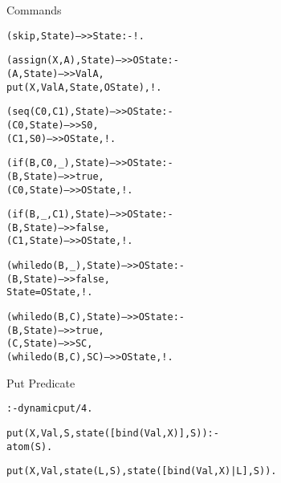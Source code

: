 \documentclass{beamer}
\begin{document}
\begin{frame}[fragile]{Commands}
\tiny
\begin{alltt}
% semantics of commands

(skip,State) -->> State :- !.          % skip

(assign(X,A),State) -->> OState :-     % assignment
    (A,State) -->> ValA,
    put(X,ValA,State,OState),!.

(seq(C0,C1),State) -->> OState :-      % composition, seq
    (C0,State) -->> S0,
    (C1,S0) -->> OState,!.

(if(B,C0,_),State) -->> OState :-     % if
    (B,State) -->> true,
    (C0,State) -->> OState,!.

(if(B,_,C1),State) -->> OState :-     % if
    (B,State) -->> false,
    (C1,State) -->> OState,!.

(whiledo(B,_),State) -->> OState :-    % while
    (B,State) -->> false,
    State=OState,!.

(whiledo(B,C),State) -->> OState :-    % while
    (B,State) -->> true,
    (C,State) -->> SC,
    (whiledo(B,C),SC) -->> OState,!.
\end{alltt}
\end{frame}


\begin{frame}[fragile]{Put Predicate}
\scriptsize
\begin{alltt}
% the predicate 'put(+Variable,+Value,+State,-FinalState)' adds
% a binding term to the state.
:- dynamic put/4.                   % modifiable predicate

put(X,Val,S,state([bind(Val,X)],S)) :- 
    atom(S).

put(X,Val,state(L,S),state([bind(Val,X)|L],S)).
\end{alltt}
\end{frame}
\end{document}
